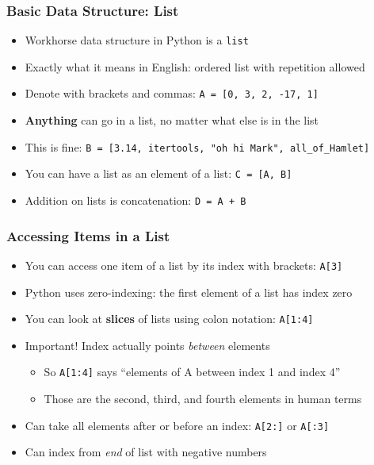 \documentclass[aspectratio=169]{beamer}
\begin{document}
\begin{frame}
\frametitle{Basic Data Structure: List}

\begin{itemize}
	\item Workhorse data structure in Python is a \texttt{list}
	
	\item Exactly what it means in English: ordered list with repetition allowed
	
	\item Denote with brackets and commas: \texttt{A = [0, 3, 2, -17, 1]}
	
	\item <2->\textbf{Anything} can go in a list, no matter what else is in the list
	
	\item <2->This is fine: \texttt{B = [3.14, itertools, "oh hi Mark", all\_of\_Hamlet]}
	
	\item <3->You can have a list as an element of a list: \texttt{C = [A, B]}
	
	\item <3->Addition on lists is concatenation: \texttt{D = A + B}
\end{itemize}
\end{frame}

\begin{frame}
\frametitle{Accessing Items in a List}

\begin{itemize}
	\item You can access one item of a list by its index with brackets: \texttt{A[3]}
	
	\item Python uses zero-indexing: the first element of a list has index zero
	
	\item <2->You can look at \textbf{slices} of lists using colon notation: \texttt{A[1:4]}
	
	\item <2->Important! Index actually points \textit{between} elements
	\begin{itemize}
		\item <2->So \texttt{A[1:4]} says ``elements of A between index 1 and index 4''
		
		\item <2->Those are the second, third, and fourth elements in human terms
	\end{itemize}

	\item <3->Can take all elements after or before an index: \texttt{A[2:]} or \texttt{A[:3]}
	
	\item <3->Can index from \textit{end} of list with negative numbers
\end{itemize}
\end{frame}
\end{document}
